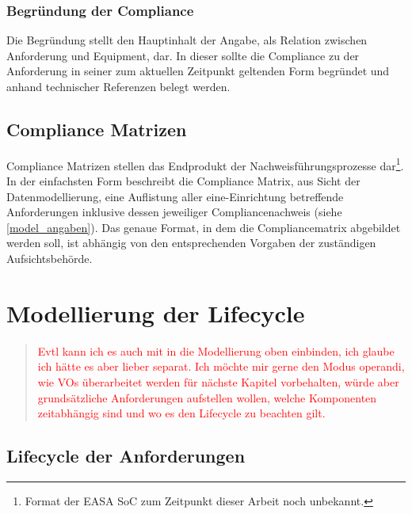 \subsubsection{Begründung der Compliance}

Die Begründung stellt den Hauptinhalt der Angabe, als Relation zwischen Anforderung und Equipment, dar. 
In dieser sollte die Compliance zu der Anforderung in seiner zum aktuellen Zeitpunkt geltenden Form begründet und anhand technischer Referenzen belegt werden.




\subsection{Compliance Matrizen}

Compliance Matrizen stellen das Endprodukt der Nachweisführungsprozesse dar\footnote{Format der \ac{EASA} \ac{SoC} zum Zeitpunkt dieser Arbeit noch unbekannt.}.
In der einfachsten Form beschreibt die Compliance Matrix, aus Sicht der Datenmodellierung, eine Auflistung aller eine\atmans-Einrichtung betreffende Anforderungen inklusive dessen jeweiliger Compliancenachweis (siehe \ref{model_angaben}).
Das genaue Format, in dem die Compliancematrix abgebildet werden soll, ist abhängig von den entsprechenden Vorgaben der zuständigen Aufsichtsbehörde.

\pagebreak


\section{Modellierung der Lifecycle}

\begin{quote}
\textcolor{red}{Evtl kann ich es auch mit in die Modellierung oben einbinden, ich glaube ich hätte es aber lieber separat.  Ich möchte mir gerne den Modus operandi, wie VOs überarbeitet werden für nächste Kapitel vorbehalten, würde aber grundsätzliche Anforderungen aufstellen wollen, welche Komponenten zeitabhängig sind und wo es den Lifecycle zu beachten gilt.}
\end{quote}

\subsection{Lifecycle der Anforderungen}
